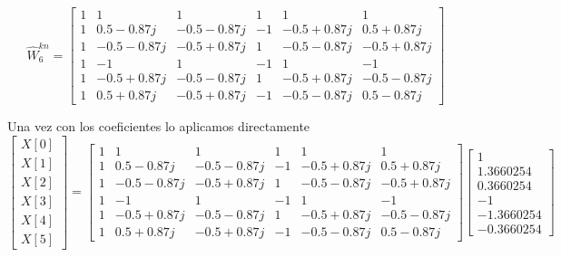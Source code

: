 \documentclass[12pt]{article}
\begin{document}
$$
\hat{W}^{kn}_6 =
\begin{bmatrix}
1 & 1 & 1 & 1 & 1 & 1 \\
1 & 0.5-0.87j & -0.5-0.
87j & -1 & -0.5+0.87j & 0.5+0.87j \\
1 & -0.5-0.87j & -0.5+0.87j & 1 & -0.5-0.87j & -0.5+0.87j \\
1 & -1 & 1 & -1 & 1 & -1 \\
1 & -0.5+0.87j & -0.5-0.87j & 1 & -0.5+0.87j & -0.5-0.87j \\
1 & 0.5+0.87j & -0.5+0.87j & -1 & -0.5-0.87j & 0.5-0.87j
\end{bmatrix}
$$

Una vez con los coeficientes lo aplicamos directamente
$$
\begin{bmatrix}
X[0] \\
X[1] \\
X[2] \\
X[3] \\
X[4] \\
X[5]
\end{bmatrix}
= 
\begin{bmatrix}
1 & 1 & 1 & 1 & 1 & 1 \\
1 & 0.5-0.87j & -0.5-0.
87j & -1 & -0.5+0.87j & 0.5+0.87j \\
1 & -0.5-0.87j & -0.5+0.87j & 1 & -0.5-0.87j & -0.5+0.87j \\
1 & -1 & 1 & -1 & 1 & -1 \\
1 & -0.5+0.87j & -0.5-0.87j & 1 & -0.5+0.87j & -0.5-0.87j \\
1 & 0.5+0.87j & -0.5+0.87j & -1 & -0.5-0.87j & 0.5-0.87j
\end{bmatrix}
\begin{bmatrix}
    1 \\
    1.3660254 \\
    0.3660254 \\
    -1 \\
    -1.3660254 \\
    -0.3660254
\end{bmatrix}
$$
\end{document}

